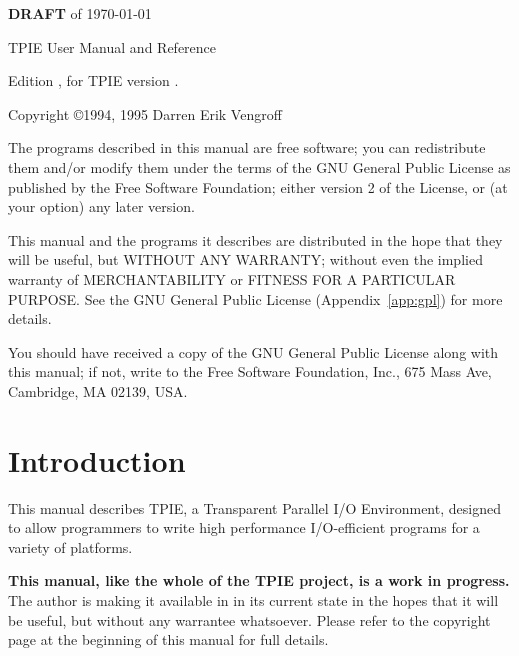 \begin{titlepage}

\vspace*{5 ex}

\centerline{\Large {\bf DRAFT} of \today}

\vspace{\fill}


\noindent TPIE User Manual and Reference

\noindent Edition \edition, for TPIE version \version.

\vspace{2 ex}

\noindent Copyright \copyright 1994, 1995 Darren Erik Vengroff

\vspace{2 ex}

The programs described in this manual are free software; you can
redistribute them and/or modify them under the terms of the GNU General
Public License as published by the Free Software Foundation; either
version 2 of the License, or (at your option) any later version.

This manual and the programs it describes are distributed in the hope
that they will be useful, but WITHOUT ANY WARRANTY; without even the
implied warranty of MERCHANTABILITY or FITNESS FOR A PARTICULAR
PURPOSE.  See the GNU General Public License (Appendix~\ref{app:gpl})
for more details.

You should have received a copy of the GNU General Public License
along with this manual; if not, write to the Free Software Foundation,
Inc., 675 Mass Ave, Cambridge, MA 02139, USA.
\end{titlepage}

\tableofcontents

\chapter*{Introduction}

This manual describes TPIE, a Transparent Parallel I/O Environment,
designed to allow programmers to write high performance I/O-efficient
programs for a variety of platforms.

{\bf This manual, like the whole of the TPIE project, is a work in
  progress.}  The author is making it available in in its current state
in the hopes that it will be useful, but without any warrantee
whatsoever.  Please refer to the copyright page at the beginning of
this manual for full details.

